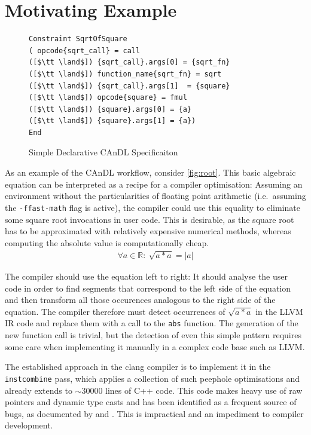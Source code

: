 \section{Motivating Example}

\begin{figure}[b]
\centering
\begin{minipage}[t]{0.67\textwidth}
\begin{lstlisting}[language=CAnDL]
Constraint SqrtOfSquare
( opcode{sqrt_call} = call
([$\tt \land$]) {sqrt_call}.args[0] = {sqrt_fn}
([$\tt \land$]) function_name{sqrt_fn} = sqrt
([$\tt \land$]) {sqrt_call}.args[1]  = {square}
([$\tt \land$]) opcode{square} = fmul
([$\tt \land$]) {square}.args[0] = {a}
([$\tt \land$]) {square}.args[1] = {a})
End
\end{lstlisting}
\end{minipage}
\caption{Simple Declarative CAnDL Specificaiton}
\label{fig:candlspec}
\end{figure}

    As an example of the CAnDL workflow, consider \autoref{fig:root}.
    This basic algebraic equation can be interpreted as a recipe for a compiler
    optimisation:
    Assuming an environment without the particularities of floating point
    arithmetic (i.e.\ assuming the \texttt{-ffast-math} flag is active), the
    compiler could use this equality to eliminate some square root invocations
    in user code.
    This is desirable, as the square root has to be approximated with relatively
    expensive numerical methods, whereas computing the absolute value is
    computationally cheap.
    \begin{align}
    \label{fig:root}
    \forall a\in \mathbb{R}\colon\ \sqrt{a*a}=|a|
    \end{align}

    The compiler should use the equation left to right:
    It should analyse the user code in order to find segments that correspond to
    the left side of the equation and then transform all those occurences
    analogous to the right side of the equation.
    The compiler therefore must detect occurrences of $\sqrt{a*a}$ in the
    LLVM IR code and replace them with a call to the \texttt{abs} function.
    The generation of the new function call is trivial, but the detection of
    even this simple pattern requires some care when implementing it manually in
    a complex code base such as LLVM.

    The established approach in the clang compiler is to implement it in the
    \texttt{instcombine} pass, which applies a collection of such
    peephole optimisations and already extends to $\sim30000$ lines of
    C++ code.
    This code makes heavy use of raw pointers and dynamic type casts and has
    been identified as a frequent source of bugs, as documented by
    \citet{Yang:2011:FUB:1993316.1993532} and
    \citet{Menendez:2017:ADP:3062341.3062372}.
    This is impractical and an impediment to compiler development.

